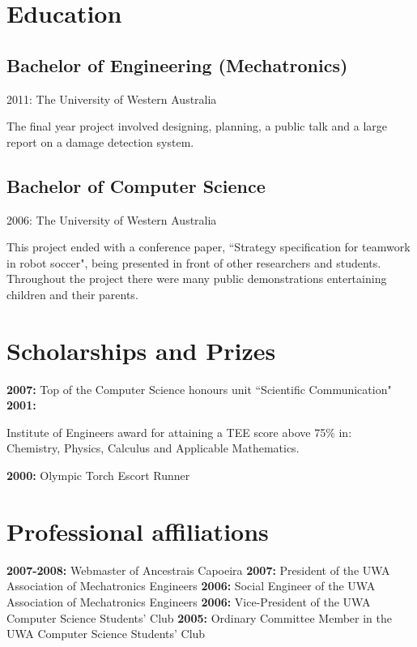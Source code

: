 \documentclass[10pt, a4paper]{report}
\begin{document}
\section*{Education}

\subsection*{Bachelor of Engineering (Mechatronics)}
	\begin{basedescript}{\desclabelstyle{\pushlabel}\desclabelwidth{2em}}
	\item[2011:] The University of Western Australia
	\end{basedescript}
The final year project involved designing, planning, a public talk and a large report on a damage detection system.
\subsection*{Bachelor of Computer Science} %
\begin{basedescript}{\desclabelstyle{\pushlabel}\desclabelwidth{2em}}
	\item[2006:] The University of Western Australia
	\end{basedescript}
This project ended with a conference paper, ``Strategy specification for teamwork in robot soccer",  being presented in front of other researchers and students. Throughout the project there were many public demonstrations entertaining children and their parents.
\section*{Scholarships and Prizes}
{\bf 2007:} Top of the Computer Science honours unit ``Scientific Communication" \newline
{\bf 2001:} \parbox[t]{32em}{Institute of Engineers award for attaining a TEE score above 75\% in:\\
Chemistry, Physics, Calculus and Applicable Mathematics.} \newline
{\bf 2000:} Olympic Torch Escort Runner	 \newline
\section*{Professional affiliations}
{\bf 2007-2008:} Webmaster of Ancestrais Capoeira \newline
{\bf 2007:} President of the UWA Association of Mechatronics Engineers \newline
{\bf 2006:} Social Engineer of the UWA Association of Mechatronics Engineers \newline
{\bf 2006:} Vice-President of the UWA Computer Science Students' Club \newline
{\bf 2005:} Ordinary Committee Member in the UWA Computer Science Students' Club \newline
\end{document}
